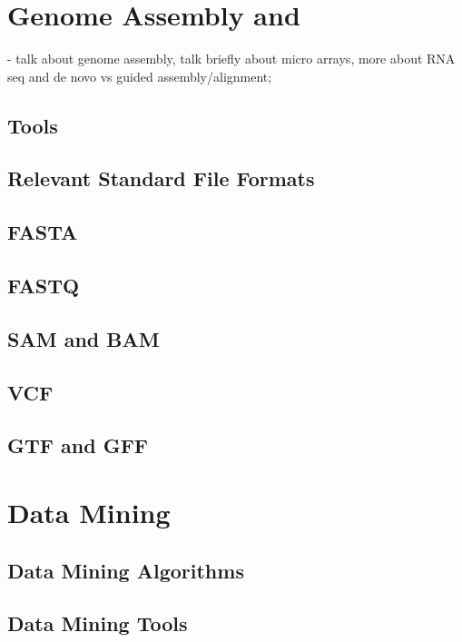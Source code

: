 \section{Genome Assembly and \rnaseq}\label{sec:assembly}

- talk about genome assembly, talk briefly about micro arrays, more about RNA
  seq and de novo vs guided assembly/alignment;\\

\subsection{\rnaseq{} Tools}\label{sec:seqtools}

\subsection{Relevant Standard File Formats}\label{sec:formats}

\subsection{FASTA}

\subsection{FASTQ}

\subsection{SAM and BAM}

\subsection{VCF}

\subsection{GTF and GFF}

\section{Data Mining}\label{sec:mlearning}

\subsection{Data Mining Algorithms}\label{sec:minalgo}

\subsection{Data Mining Tools}\label{sec:mintools}

